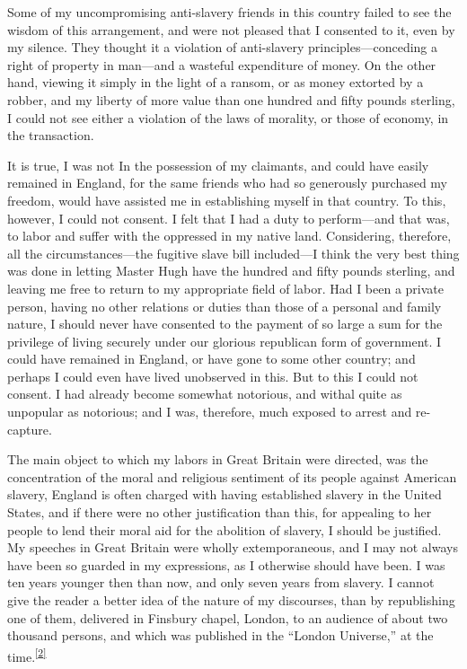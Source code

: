 Some of my uncompromising anti-slavery friends in this country failed to
see the wisdom of this arrangement, and were not pleased that I
consented to it, even by my silence. They thought it a violation of
anti-slavery principles---conceding a right of property in man---and a
wasteful expenditure of money. On the other hand, viewing it simply in
the light of a ransom, or as money extorted by a robber, and my liberty
of more value than one hundred and fifty pounds sterling, I could not
see either a violation of the laws of morality, or those of economy, in
the transaction.

{}It is true, I was not In the possession of my claimants, and could
have easily remained in England, for the same friends who had so
generously purchased my freedom, would have assisted me in establishing
myself in that country. To this, however, I could not consent. I felt
that I had a duty to perform---and that was, to labor and suffer with
the oppressed in my native land. Considering, therefore, all the
circumstances---the fugitive slave bill included---I think the very best
thing was done in letting Master Hugh have the hundred and fifty pounds
sterling, and leaving me free to return to my appropriate field of
labor. Had I been a private person, having no other relations or duties
than those of a personal and family nature, I should never have
consented to the payment of so large a sum for the privilege of living
securely under our glorious republican form of government. I could have
remained in England, or have gone to some other country; and perhaps I
could even have lived unobserved in this. But to this I could not
consent. I had already become somewhat notorious, and withal quite as
unpopular as notorious; and I was, therefore, much exposed to arrest and
re-capture.

The main object to which my labors in Great Britain were directed, was
the concentration of the moral and religious sentiment of its people
against American slavery, England is often charged with having
{}established slavery in the United States, and if there were no other
justification than this, for appealing to her people to lend their moral
aid for the abolition of slavery, I should be justified. My speeches in
Great Britain were wholly extemporaneous, and I may not always have been
so guarded in my expressions, as I otherwise should have been. I was ten
years younger then than now, and only seven years from slavery. I cannot
give the reader a better idea of the nature of my discourses, than by
republishing one of them, delivered in Finsbury chapel, London, to an
audience of about two thousand persons, and which was published in the
``London Universe,'' at the
time.\textsuperscript{\protect\hyperlink{cite_note-2}{{[}2{]}}}

